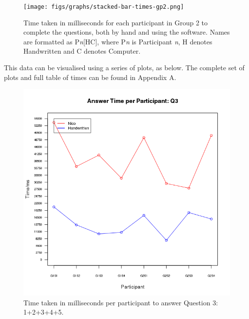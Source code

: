 \documentclass[12pt,twoside,notitlepage,xetex]{report}
\begin{document}
\begin{center}
\begin{figure}[H]
\begin{center}
\texttt{[image: figs/graphs/stacked-bar-times-gp2.png]}
\end{center}
\caption{Time taken in milliseconds for each participant in Group 2 to complete the questions, both by hand and using the software.  Names are formatted as P\emph{n}[HC], where P\emph{n} is Participant \emph{n}, H denotes Handwritten and C denotes Computer.}
\label{fig:StacksGp2}
\end{figure}
\end{center}

This data can be visualised using a series of plots, as below.  The complete set of plots and full table of times can be found in Appendix A.

\begin{center}
\begin{figure}[H]
\begin{center}
\includegraphics[width=\textwidth-2cm]{figs/graphs/q3.png}
\end{center}
\caption{Time taken in milliseconds per participant to answer Question 3: 1+2+3+4+5.}
\label{fig:PlotQ3}
\end{figure}
\end{center}
\end{document}
